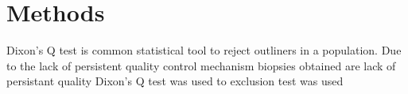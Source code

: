 \chapter{Methods}

Dixon's Q test is common statistical tool to reject outliners in a population. Due to the lack of persistent quality control mechanism biopsies obtained are lack of persistant quality Dixon's Q test was used to   exclusion test was used 